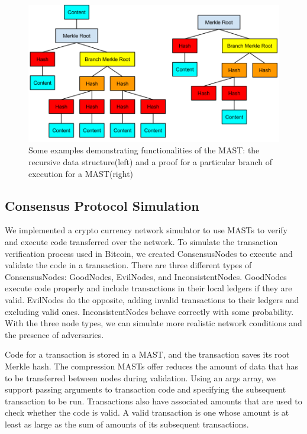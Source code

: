 \documentclass{vldb}
\begin{document}
\begin{figure}[h]
	\includegraphics[scale=.35]{mast}
	\caption{Some examples demonstrating functionalities of  the MAST: the recursive data structure(left) and a proof for a particular branch of execution for a MAST(right)}
	\label{system}
\end{figure}

\subsection{Consensus Protocol Simulation}

We implemented a crypto currency network simulator to use MASTs to verify and execute code transferred over the network. To simulate the transaction verification process used in Bitcoin, we created ConsensusNodes to execute and validate the code in a transaction. There are three different types of ConsensusNodes: GoodNodes, EvilNodes, and InconsistentNodes. GoodNodes execute code properly and include transactions in their local ledgers if they are valid. EvilNodes do the opposite, adding invalid transactions to their ledgers and excluding valid ones. InconsistentNodes behave correctly with some probability. With the three node types, we can simulate more realistic network conditions and the presence of adversaries.

Code for a transaction is stored in a MAST, and the transaction saves its root Merkle hash. The compression MASTs offer reduces the amount of data that has to be transferred between nodes during validation. Using an args array, we support passing arguments to transaction code and specifying the subsequent transaction to be run. Transactions also have associated amounts that are used to check whether the code is valid. A valid transaction is one whose amount is at least as large as the sum of amounts of its subsequent transactions.
\end{document}
